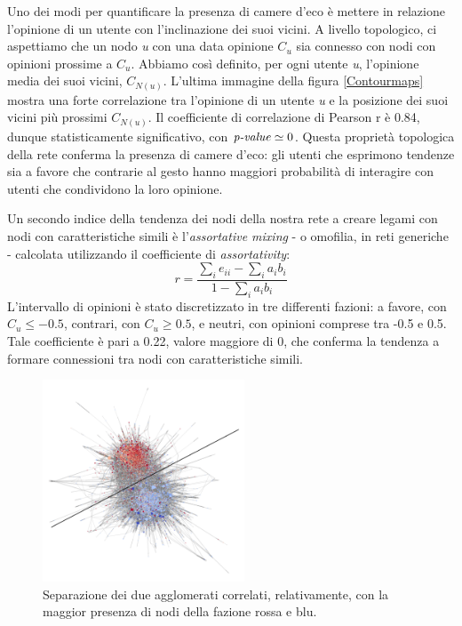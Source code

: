     
    
    Uno dei modi per quantificare la presenza di camere d'eco è mettere in relazione l'opinione di un utente con l'inclinazione dei suoi vicini. A livello topologico, ci aspettiamo che un nodo \textit{u} con una data opinione $C_{u}$ sia connesso con nodi con opinioni prossime a $C_{u}$. Abbiamo così definito, per ogni utente \textit{u}, l'opinione media dei suoi vicini, $C_{N(u)}$. L'ultima immagine della figura \ref{Contourmaps} mostra una forte correlazione tra l'opinione di un utente \textit{u} e la posizione dei suoi vicini più prossimi $C_{N(u)}$. Il coefficiente di correlazione di Pearson r è 0.84, dunque statisticamente significativo, con $\text{\textit{p-value}} \simeq 0$. Questa proprietà topologica della rete conferma la presenza di camere d'eco: gli utenti che esprimono tendenze sia a favore che contrarie al gesto hanno maggiori probabilità di interagire con utenti che condividono la loro opinione.
    
    Un secondo indice della tendenza dei nodi della nostra rete a creare legami con nodi con caratteristiche simili è l'\textit{assortative mixing} - o omofilia, in reti generiche - calcolata utilizzando il coefficiente di \textit{assortativity}:
    \begin{equation}
        r=\frac{\sum_i e_{ii}-\sum_i a_i b_i}{1-\sum_i a_i b_i}
        \label{omofily_coefficient}
    \end{equation}
    L'intervallo di opinioni è stato discretizzato in tre differenti fazioni: a favore, con $C_{u}\leq-0.5$, contrari, con $C_{u}\geq0.5$, e neutri, con opinioni comprese tra -0.5 e 0.5. Tale coefficiente è pari a 0.22, valore maggiore di 0, che conferma la tendenza a formare connessioni tra nodi con caratteristiche simili.
    
    \begin{figure}
        \centering
        \includegraphics[width=6cm] {7_Open_question/echo_chamber_division.png}
        \caption{Separazione dei due agglomerati correlati, relativamente, con la maggior presenza di nodi della fazione rossa e blu.}
        \label{echo_chamber_division}
    \end{figure}
    
